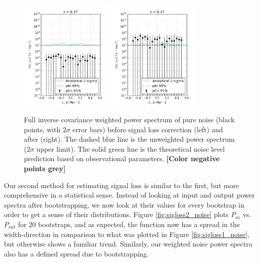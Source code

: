 \documentclass[preprint2,numberedappendix,tighten,twocolappendix]{aastex6}  %
\newcommand{\cc}[1]{{\color{purple} \textbf{[#1]}}}
\begin{document}
\begin{figure}
	\centering
	\includegraphics[width=0.4\textwidth]{ps1_noise_nosigloss.png}
	\includegraphics[width=0.4\textwidth]{ps1_noise.png}
	\caption{Full inverse covariance weighted power spectrum of pure noise (black points, with $2\sigma$ error bars) before signal loss correction (left) and after (right). The dashed blue line is the unweighted power spectrum ($2\sigma$ upper limit). The solid green line is the theoretical noise level prediction based on observational parameters. \cc{Color negative points grey}}
	\label{fig:ps1_noise}
\end{figure}

Our second method for estimating signal loss is similar to the first, but more comprehensive in a statistical sense. Instead of looking at input and output power spectra after bootstrapping, we now look at their values for every bootstrap in order to get a sense of their distributions. Figure \ref{fig:sigloss2_noise} plots $P_{in}$ vs. $P_{out}$ for $20$ bootstraps, and as expected, the function now has a spread in the width-direction in comparison to what was plotted in Figure \ref{fig:sigloss1_noise}, but otherwise shows a familiar trend. Similarly, our weighted noise power spectra also has a defined spread due to bootstrapping.
\end{document}
